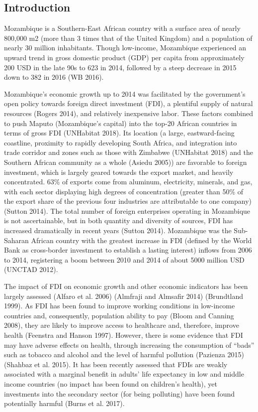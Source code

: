 \documentclass[]{article}
\begin{document}
\subsection{Introduction}\label{introduction}

Mozambique is a Southern-East African country with a surface area of
nearly 800,000 m2 (more than 3 times that of the United Kingdom) and a
population of nearly 30 million inhabitants. Though low-income,
Mozambique experienced an upward trend in gross domestic product (GDP)
per capita from approximately 200 USD in the late 90s to 623 in 2014,
followed by a steep decrease in 2015 down to 382 in 2016 (WB 2016).

Mozambique's economic growth up to 2014 was facilitated by the
government's open policy towards foreign direct investment (FDI), a
plentiful supply of natural resources (Rogers 2014), and relatively
inexpensive labor. These factors combined to push Maputo (Mozambique's
capital) into the top-20 African countries in terms of gross FDI
(UNHabitat 2018). Its location (a large, eastward-facing coastline,
proximity to rapidly developing South Africa, and integration into trade
corridor and zones such as those with Zimbabwe (UNHabitat 2018) and the
Southern African community as a whole (Asiedu 2005)) are favorable to
foreign investment, which is largely geared towards the export market,
and heavily concentrated. 63\% of exports come from aluminum,
electricity, minerals, and gas, with each sector displaying high degrees
of concentration (greater than 50\% of the export share of the previous
four industries are attributable to one company) (Sutton 2014). The
total number of foreign enterprises operating in Mozambique is not
ascertainable, but in both quantity and diversity of sources, FDI has
increased dramatically in recent years (Sutton 2014). Mozambique was the
Sub-Saharan African country with the greatest increase in FDI (defined
by the World Bank as cross-border investment to establish a lasting
interest) inflows from 2006 to 2014, registering a boom between 2010 and
2014 of about 5000 million USD (UNCTAD 2012).

The impact of FDI on economic growth and other economic indicators has
been largely assessed (Alfaro et al. 2006) (Almfraji and Almsafir 2014)
(Brundtland 1999). As FDI has been found to improve working conditions
in low-income countries and, consequently, population ability to pay
(Bloom and Canning 2008), they are likely to improve access to
healthcare and, therefore, improve health (Feenstra and Hanson 1997).
However, there is some evidence that FDI may have adverse effects on
health, through increasing the consumption of ``bads'' such as tobacco
and alcohol and the level of harmful pollution (Pazienza 2015) (Shahbaz
et al. 2015). It has been recently assessed that FDIs are weakly
associated with a marginal benefit in adults' life expectancy in low and
middle income countries (no impact has been found on children's health),
yet investments into the secondary sector (for being polluting) have
been found potentially harmful (Burns et al. 2017).
\end{document}
